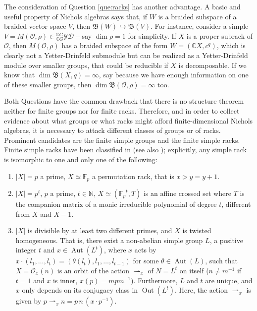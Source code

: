 \documentclass[11pt]{amsart} \textheight 22cm
\newcommand{\fp}{{\mathbb F}_p}
\renewcommand{\^}[1]{\mbox{$^{\left( #1 \right)}$}}
\renewcommand{\_}[1]{\mbox{$_{\left( #1 \right)}$}}
\newcommand\toba{{\mathfrak B }}
\newcommand{\trid}{\triangleright}
\newcommand{\ku}{\mathbb C}
\newcommand{\N}{{\mathbb N}}
\newcommand{\GL}{\mathbf{GL}}
\newcommand{\oc}{{\mathcal O}}
\newcommand{\ydg}{{}^{\ku G}_{\ku G}\mathcal{YD}}
\newcommand{\Aut}{\operatorname{Aut}}
\newcommand{\Out}{\operatorname{Out}}
\theoremstyle{plain}
\theoremstyle{definition}
\theoremstyle{remark}
\newcommand\id{\operatorname{id}}
\theoremstyle{remark}
\begin{document}
\medbreak The consideration of Question \ref{que:racks} has
another advantage. A basic and useful property of Nichols algebras
says that, if $W$ is a braided subspace of a braided vector space
$V$, then $\toba(W) \hookrightarrow \toba(V)$. For instance,
consider a simple $V = M(\oc, \rho)\in \ydg$ -- say $\dim \rho =
1$ for simplicity. If $X$ is a proper subrack of $\oc$, then
$M(\oc, \rho)$ has a braided subspace of the form $W = (\ku X,
c^q)$, which is clearly not a Yetter-Drinfeld submodule but can be
realized as a Yetter-Drinfeld module over smaller groups, that
could be reducible if $X$ is decomposable. If we know that $\dim
\toba(X, q) = \infty$, say because we have enough information on
one of these smaller groups, then $\dim\toba(\oc,\rho)=\infty$
too.

\medbreak Both Questions have the common drawback that there is no
structure theorem neither for finite groups nor for finite racks.
Therefore, and in order to collect evidence about what groups or
what racks might afford finite-dimensional Nichols algebras, it is
necessary to attack different classes of groups or of racks.
Prominent candidates are the finite simple groups and the finite
simple racks. Finite simple racks have been classified in
\cite[Th. 3.9, Th. 3.12]{AG1} (see also \cite{jo}); explicitly,
any simple rack is isomorphic to one and only one of the
following:


\begin{enumerate}
    \item\label{clasif:permutation-rack} $|X|=p$ a prime, $X\simeq\fp$ a permutation rack, that is $x\trid y=y+1$.
    \item $|X|=p^t$, $p$ a prime, $t\in \N$, $X\simeq({\fp}^t, T)$ is an affine crossed set
        where $T$ is the companion matrix of a monic irreducible polynomial of degree $t$,
        different from $X$ and $X-1$.
    \item $|X|$ is divisible by at least two different primes, and $X$ is twisted
        homogeneous. That is,  there exist a non-abelian simple group $L$, a positive
        integer $t$ and  $x \in \Aut (L^t)$, where $x$ acts by
        $x\cdot(l_1,\ldots,l_t)=(\theta(l_t),l_1,\ldots,l_{t-1})$ for some
        $\theta\in\Aut(L)$, such that $X = {\mathcal O_x}(n)$ is an orbit of the action
        $\rightharpoonup_x$ of $N=L^t$ on itself ($n \neq m^{-1}$ if $t=1$ and $x$ is inner,
        $x(p) = mpm^{-1}$).  Furthermore, $L$ and $t$ are unique, and $x$ only depends on
        its conjugacy class in $\Out (L^t)$.  Here, the action $\rightharpoonup_x$ is given
        by $p\rightharpoonup_xn=p\,n\,(x\cdot p^{-1})$.
\end{enumerate}
\end{document}
